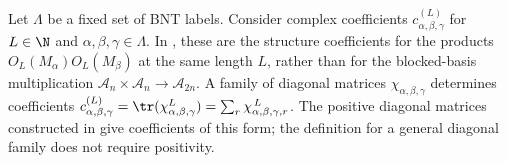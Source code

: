 \begin{definition}%
    \label{def:mpdo_bnt_label_coefficient_family}
    \leanok
    Let $\Lambda$ be a fixed set of BNT labels. Consider complex coefficients
    $c^{(L)}_{\alpha,\beta,\gamma}$ for $L\in\N$ and
    $\alpha,\beta,\gamma\in\Lambda$. In
    \cite[Theorem~4.14(ii)]{Cirac2016MPDO_arXiv}, these are the structure
    coefficients for the products $O_L(M_\alpha)O_L(M_\beta)$ at the same
    length $L$, rather than for the blocked-basis multiplication
    $\mathcal A_n\times\mathcal A_n\to\mathcal A_{2n}$.
    A family of diagonal matrices $\chi_{\alpha,\beta,\gamma}$ determines
    coefficients
    $c^{(L)}_{\alpha,\beta,\gamma}
        = \tr(\chi_{\alpha,\beta,\gamma}^{L})
        = \sum_r\chi_{\alpha,\beta,\gamma,r}^{\,L}$.
    The positive diagonal matrices constructed in
    \cite[Appendix~C.4]{Cirac2016MPDO_arXiv} give coefficients of this form;
    the definition for a general diagonal family does not require positivity.
\end{definition}

